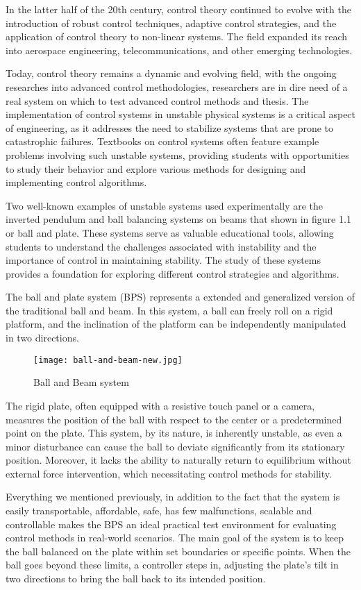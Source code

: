 In the latter half of the 20th century, control theory continued to evolve with the introduction of robust control techniques, adaptive control strategies, and the application of control theory to non-linear systems. The field expanded its reach into aerospace engineering, telecommunications, and other emerging technologies.

Today, control theory remains a dynamic and evolving field, with the ongoing researches into advanced control methodologies, researchers are in dire need of a real system on which to test advanced control methods and thesis.
The implementation of control systems in unstable physical systems is a critical aspect of engineering, as it addresses the need to stabilize systems that are prone to catastrophic failures. Textbooks on control systems often feature example problems involving such unstable systems, providing students with opportunities to study their behavior and explore various methods for designing and implementing control algorithms.

Two well-known examples of unstable systems used experimentally are the inverted pendulum and ball balancing systems on beams that shown in figure 1.1 or ball and plate. These systems serve as valuable educational tools, allowing students to understand the challenges associated with instability and the importance of control in maintaining stability. The study of these systems provides a foundation for exploring different control strategies and algorithms.

The ball and plate system (BPS) represents a extended and generalized version of the traditional ball and beam. In this system, a ball can freely roll on a rigid platform, and the inclination of the platform can be independently manipulated in two directions. 
\begin{figure}
    \centering
    \texttt{[image: ball-and-beam-new.jpg]}
    \caption{Ball and Beam system}
    \label{fig:enter-label}
\end{figure}
The rigid plate, often equipped with a resistive touch panel or a camera, measures the position of the ball with respect to the center or a predetermined point on the plate. This system, by its nature, is inherently unstable, as even a minor disturbance can cause the ball to deviate significantly from its stationary position. Moreover, it lacks the ability to naturally return to equilibrium without external force intervention, which necessitating control methods for stability.

Everything we mentioned previously, in addition to the fact that the system is easily transportable, affordable, safe, has few malfunctions, scalable and controllable makes the BPS an ideal practical test environment for evaluating control methods in real-world scenarios. The main goal of the system is to keep the ball balanced on the plate within set boundaries or specific points. When the ball goes beyond these limits, a controller steps in, adjusting the plate's tilt in two directions to bring the ball back to its intended position.

